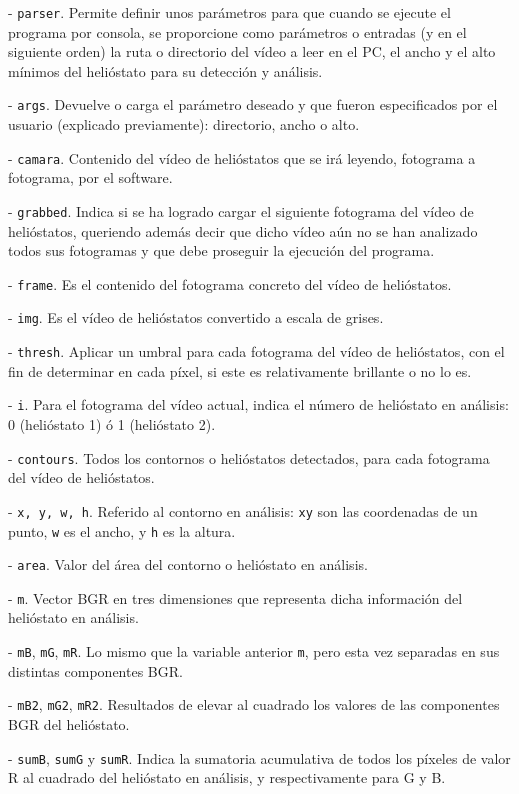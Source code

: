 - \verb|parser|. Permite definir unos parámetros para que cuando se ejecute el programa por consola, se proporcione como parámetros o entradas (y en el siguiente orden) la ruta o directorio del vídeo a leer en el PC, el ancho y el alto mínimos del helióstato para su detección y análisis.

- \verb|args|. Devuelve o carga el parámetro deseado y que fueron especificados por el usuario (explicado previamente): directorio, ancho o alto.

- \verb|camara|. Contenido del vídeo de helióstatos que se irá leyendo, fotograma a fotograma, por el software.

- \verb|grabbed|. Indica si se ha logrado cargar el siguiente fotograma del vídeo de helióstatos, queriendo además decir que dicho vídeo aún no se han analizado todos sus fotogramas y que debe proseguir la ejecución del programa.

- \verb|frame|. Es el contenido del fotograma concreto del vídeo de helióstatos.

- \verb|img|. Es el vídeo de helióstatos convertido a escala de grises.

- \verb|thresh|. Aplicar un umbral para cada fotograma del vídeo de helióstatos, con el fin de determinar en cada píxel, si este es relativamente brillante o no lo es.

- \verb|i|. Para el fotograma del vídeo actual, indica el número de helióstato en análisis: 0 (helióstato 1) ó 1 (helióstato 2).

- \verb|contours|. Todos los contornos o helióstatos detectados, para cada fotograma del vídeo de helióstatos.

- \verb|x, y, w, h|. Referido al contorno en análisis: \verb|xy| son las coordenadas de un punto, \verb|w| es el ancho, y \verb|h| es la altura.

- \verb|area|. Valor del área del contorno o helióstato en análisis.

- \verb|m|. Vector BGR en tres dimensiones que representa dicha información del helióstato en análisis.

- \verb|mB|, \verb|mG|, \verb|mR|. Lo mismo que la variable anterior \verb|m|, pero esta vez separadas en sus distintas componentes BGR.

- \verb|mB2|, \verb|mG2|, \verb|mR2|. Resultados de elevar al cuadrado los valores de las componentes BGR del helióstato.

- \verb|sumB|, \verb|sumG| y \verb|sumR|. Indica la sumatoria acumulativa de todos los píxeles de valor R al cuadrado del helióstato en análisis, y respectivamente para G y B.

